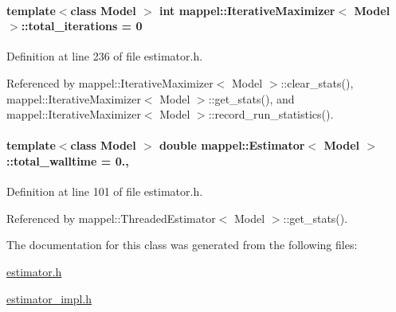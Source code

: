 \paragraph[{\texorpdfstring{total\+\_\+iterations}{total_iterations}}]{\setlength{\rightskip}{0pt plus 5cm}template$<$class Model $>$ int {\bf mappel\+::\+Iterative\+Maximizer}$<$ Model $>$\+::total\+\_\+iterations = 0\hspace{0.3cm}{\ttfamily [protected]}}\hypertarget{classmappel_1_1IterativeMaximizer_a8d344b09841e61cc726dc430d8451044}{}\label{classmappel_1_1IterativeMaximizer_a8d344b09841e61cc726dc430d8451044}


Definition at line 236 of file estimator.\+h.



Referenced by mappel\+::\+Iterative\+Maximizer$<$ Model $>$\+::clear\+\_\+stats(), mappel\+::\+Iterative\+Maximizer$<$ Model $>$\+::get\+\_\+stats(), and mappel\+::\+Iterative\+Maximizer$<$ Model $>$\+::record\+\_\+run\+\_\+statistics().

\paragraph[{\texorpdfstring{total\+\_\+walltime}{total_walltime}}]{\setlength{\rightskip}{0pt plus 5cm}template$<$class Model $>$ double {\bf mappel\+::\+Estimator}$<$ Model $>$\+::total\+\_\+walltime = 0.\hspace{0.3cm}{\ttfamily [protected]}, {\ttfamily [inherited]}}\hypertarget{classmappel_1_1Estimator_a5a408458a111c5222193871fa6bb6644}{}\label{classmappel_1_1Estimator_a5a408458a111c5222193871fa6bb6644}


Definition at line 101 of file estimator.\+h.



Referenced by mappel\+::\+Threaded\+Estimator$<$ Model $>$\+::get\+\_\+stats().



The documentation for this class was generated from the following files\+:\begin{DoxyCompactItemize}
\item 
\hyperlink{estimator_8h}{estimator.\+h}\item 
\hyperlink{estimator__impl_8h}{estimator\+\_\+impl.\+h}\end{DoxyCompactItemize}
